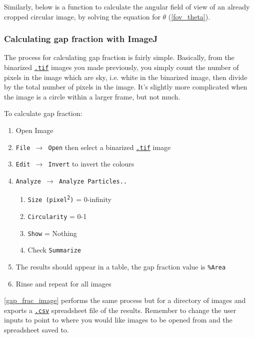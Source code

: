 \documentclass[11pt,a4paper]{article}
\newcommand\menu[1]{\texttt{\color{blue}#1}}  %
\newcommand\file[1]{\texttt{\underline{#1}}}  %
\begin{document}
Similarly, below is a function to calculate the angular field of view of an already cropped circular image, by solving the equation for $\theta$ (\autoref{fov_theta}). 

\begin{minipage}{\linewidth}

\end{minipage}

\subsubsection{Calculating gap fraction with ImageJ} \label{gapfrac}

The process for calculating gap fraction is fairly simple. Basically, from the binarized \file{.tif} images you made previously, you simply count the number of pixels in the image which are sky, i.e. white in the binarized image, then divide by the total number of pixels in the image. It's slightly more complicated when the image is a circle within a larger frame, but not much.

To calculate gap fraction: 

\begin{enumerate}
	\item{Open Image}
	\item{\menu{File $\rightarrow$ Open} then select a binarized \file{.tif} image} 
	\item{\menu{Edit $\rightarrow$ Invert} to invert the colours}
	\item{\menu{Analyze $\rightarrow$ Analyze Particles..}}
		\begin{enumerate}
			\item{\menu{Size (pixel\textsuperscript{2})} = 0-infinity}
			\item{\menu{Circularity} = 0-1}
			\item{\menu{Show} = Nothing}
			\item{Check \menu{Summarize}}
		\end{enumerate}
	\item{The results should appear in a table, the gap fraction value is \menu{\%Area}}
	\item{Rinse and repeat for all images}
\end{enumerate}

\autoref{gap_frac_image} performs the same process but for a directory of images and exports a \file{.csv} spreadsheet file of the results. Remember to change the user inputs to point to where you would like images to be opened from and the spreadsheet saved to.
\end{document}
